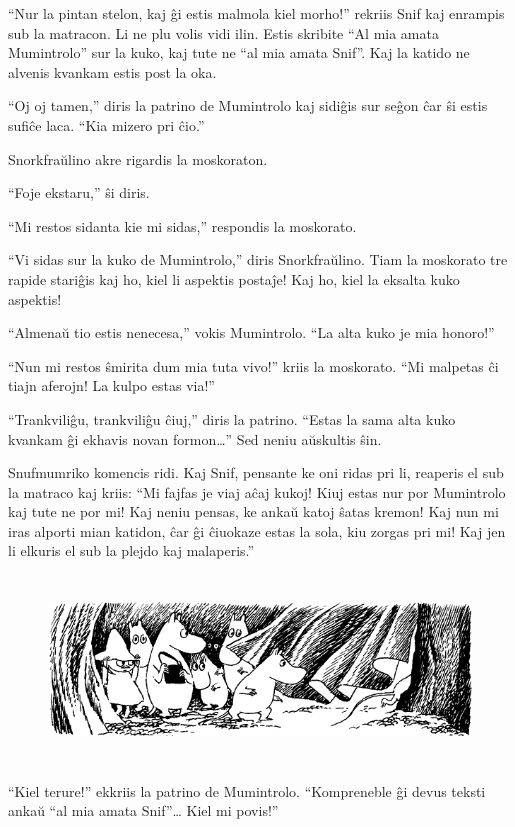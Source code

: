 ``Nur la pintan stelon, kaj ĝi estis malmola kiel morho!'' rekriis Snif kaj enrampis sub la matracon. Li ne plu volis vidi ilin. Estis skribite ``Al mia amata Mumintrolo'' sur la kuko, kaj tute ne ``al mia amata Snif''. Kaj la katido ne alvenis kvankam estis post la oka.

``Oj oj tamen,'' diris la patrino de Mumintrolo kaj sidiĝis sur seĝon ĉar ŝi estis sufiĉe laca. ``Kia mizero pri ĉio.''

Snorkfraŭlino akre rigardis la moskoraton.

``Foje ekstaru,'' ŝi diris.

``Mi restos sidanta kie mi sidas,'' respondis la moskorato.

``Vi sidas sur la kuko de Mumintrolo,'' diris Snorkfraŭlino. Tiam la moskorato tre rapide stariĝis kaj ho, kiel li aspektis postaĵe! Kaj ho, kiel la eksalta kuko aspektis!

``Almenaŭ tio estis nenecesa,'' vokis Mumintrolo. ``La alta kuko je mia honoro!''

``Nun mi restos ŝmirita dum mia tuta vivo!'' kriis la moskorato. ``Mi malpetas ĉi tiajn aferojn! La kulpo estas via!''

``Trankviliĝu, trankviliĝu ĉiuj,'' diris la patrino. ``Estas la sama alta kuko kvankam ĝi ekhavis novan formon{\ldots}'' Sed neniu aŭskultis ŝin.

Snufmumriko komencis ridi. Kaj Snif, pensante ke oni ridas pri li, reaperis el sub la matraco kaj kriis: ``Mi fajfas je viaj aĉaj kukoj! Kiuj estas nur por Mumintrolo kaj tute ne por mi! Kaj neniu pensas, ke ankaŭ katoj ŝatas kremon! Kaj nun mi iras alporti mian katidon, ĉar ĝi ĉiuokaze estas la sola, kiu zorgas pri mi! Kaj jen li elkuris el sub la plejdo kaj malaperis.''

\begin{figure}[htbp]
\centering
\includegraphics[width=450pt,height=141pt]{9-7.png}
\caption{}
\label{9-7}
\end{figure}

``Kiel terure!'' ekkriis la patrino de Mumintrolo. ``Kompreneble ĝi devus teksti ankaŭ ``al mia amata Snif''{\ldots} Kiel mi povis!''


